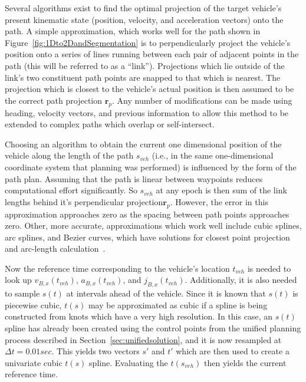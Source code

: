 \documentclass[letterpaper, 10 pt, conference]{ieeeconf}  %
\begin{document}

Several algorithms exist to find the optimal projection of the target vehicle's present kinematic state (position, velocity, and acceleration vectors) onto the path.
A simple approximation, which works well for the path shown in Figure~\ref{fig:1Dto2DandSegmentation} is to perpendicularly project the vehicle's position onto a series of lines running between each pair of adjacent points in the path (this will be referred to as a ``link'').
Projections which lie outside of the link's two constituent path points are snapped to that which is nearest.
The projection which is closest to the vehicle's actual position is then assumed to be the correct path projection $\mathbf{r}_p$.
Any number of modifications can be made using heading, velocity vectors, and previous information to allow this method to be extended to complex paths which overlap or self-intersect.

Choosing an algorithm to obtain the current one dimensional position of the vehicle along the length of the path $s_{veh}$ (i.e., in the same one-dimensional coordinate system that planning was performed) is influenced by the form of the path plan.
Assuming that the path is linear between waypoints reduces computational effort significantly.
So $s_{veh}$ at any epoch is then sum of the link lengths behind it's perpendicular projection$\mathbf{r}_p$.
However, the error in this approximation approaches zero as the spacing between path points approaches zero.
Other, more accurate, approximations which work well include cubic splines, arc splines, and Bezier curves, which have solutions for closest point projection and arc-length calculation~\cite{Wang2002,Wang2003,Schindler2011}.

Now the reference time corresponding to the vehicle's location $t_{veh}$ is needed to look up $v_{B,x}(t_{veh})$, $a_{B,x}(t_{veh})$, and $j_{B,x}(t_{veh})$.
Additionally, it is also needed to sample $s(t)$ at intervals ahead of the vehicle.
Since it is known that $s(t)$ is piecewise cubic, $t(s)$ may be approximated as cubic if a spline is being constructed from knots which have a very high resolution.
In this case, an $s(t)$ spline has already been created using the control points from the unified planning process described in Section~\ref{sec:unifiedsolution}, and it is now resampled at $\Delta t = 0.01 sec$.
This yields two vectors $s'$ and $t'$ which are then used to create a univariate cubic $t(s)$ spline.
Evaluating the $t(s_{veh})$ then yields the current reference time.
\end{document}
